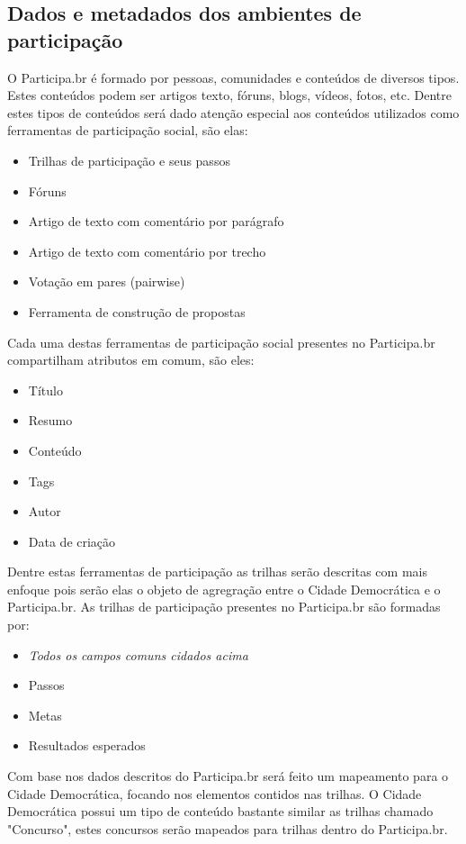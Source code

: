 \documentclass[12pt]{article}
\begin{document}
\subsection{Dados e metadados dos ambientes de participação}

O Participa.br é formado por pessoas, comunidades e conteúdos de diversos
tipos. Estes conteúdos podem ser artigos texto, fóruns, blogs, vídeos, fotos,
etc. Dentre estes tipos de conteúdos será dado atenção especial aos conteúdos
utilizados como ferramentas de participação social, são elas:

\begin{itemize}
  \item Trilhas de participação e seus passos
  \item Fóruns
  \item Artigo de texto com comentário por parágrafo
  \item Artigo de texto com comentário por trecho
  \item Votação em pares (pairwise)
  \item Ferramenta de construção de propostas
\end{itemize}

Cada uma destas ferramentas de participação social presentes no Participa.br
compartilham atributos em comum, são eles:

\begin{itemize}
  \item Título
  \item Resumo
  \item Conteúdo
  \item Tags
  \item Autor
  \item Data de criação
\end{itemize}

Dentre estas ferramentas de participação as trilhas serão descritas com mais
enfoque pois serão elas o objeto de agregração entre o Cidade Democrática e o
Participa.br. As trilhas de participação presentes no Participa.br são
formadas por:

\begin{itemize}
  \item {\it Todos os campos comuns cidados acima}
  \item Passos
  \item Metas
  \item Resultados esperados
\end{itemize}

Com base nos dados descritos do Participa.br será feito um mapeamento
para o Cidade Democrática, focando nos elementos contidos nas trilhas. O Cidade
Democrática possui um tipo de conteúdo bastante similar as trilhas chamado
"Concurso", estes concursos serão mapeados para trilhas dentro do
Participa.br.
\end{document}
